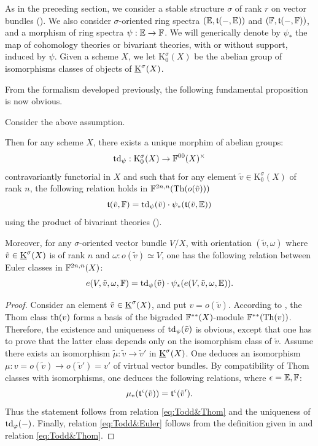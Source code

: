 \begin{num}\label{num:todd}
As in the preceding section, we consider a stable structure $\sigma$
 of rank $r$ on vector bundles
 ().
 We also consider $\sigma$-oriented ring spectra $(\mathbb E,\mathfrak{t}(-,\mathbb E))$ and $(\mathbb F,\mathfrak{t}(-,\mathbb F))$,
 and a morphism of ring spectra $\psi:\mathbb E \rightarrow \mathbb F$.
 We will generically denote by $\psi_*$ the map of cohomology theories or bivariant theories,
 with or without support, induced by $\psi$.
 Given a scheme $X$, we let $\mathrm{K}_0^\sigma(X)$ be the abelian group of isomorphisms classes of objects
 of $\operatorname{\underline K}^\sigma(X)$.

From the formalism developed previously,
 the following fundamental proposition is now obvious.
\end{num}
\begin{prop}\label{prop:computeToddclass}
Consider the above assumption.

Then for any scheme $X$, there exists a unique morphim of abelian groups:
$$
\operatorname{td}_\psi:\mathrm{K}_0^\sigma(X) \rightarrow \mathbb F^{00}(X)^\times
$$
contravariantly functorial in $X$ and such that for any element $\tilde v \in \mathrm{K}^\sigma_0(X)$
 of rank $n$,
 the following relation holds in $\mathbb F^{2n,n}(\operatorname{Th}(o(\tilde v)))$
\begin{equation}\label{eq:Todd&Thom}
\mathfrak{t}(\tilde v,\mathbb F)=\operatorname{td}_\psi(\tilde v)\cdot\psi_*(\mathfrak{t}(\tilde v,\mathbb E))
\end{equation}
using the product of bivariant theories ().

Moreover, for any $\sigma$-oriented vector bundle $V/X$,
 with orientation $(\tilde v,\omega)$ where $\tilde v \in \operatorname{\underline K}^\sigma(X)$ is of rank $n$ and $\omega:o(\tilde v)\simeq V$,
 one has the following relation between Euler classes in $\mathbb F^{2n,n}(X)$:
\begin{equation}\label{eq:Todd&Euler}
e(V,\tilde v,\omega,\mathbb F)=\operatorname{td}_\psi(\tilde v)\cdot\psi_*(e(V,\tilde v,\omega,\mathbb E)).
\end{equation}
\end{prop}
\begin{proof}
Consider an element $\tilde v \in \operatorname{\underline K}^\sigma(X)$, and put $v=o(\tilde v)$.
 According to , the Thom class $\operatorname{th}(v)$
 forms a basis of the bigraded $\mathbb F^{**}(X)$-module $\mathbb F^{**}(\operatorname{Th}(v))$.
 Therefore, the existence and uniqueness of $\operatorname{td}_\psi(\tilde v)$ is obvious,
 except that one has to prove that the latter class depends only on the isomorphism
 class of $\tilde v$.
 Assume there exists an isomorphism $\tilde \mu:\tilde v \rightarrow \tilde v'$ in $\operatorname{\underline K}^\sigma(X)$.
One deduces an isomorphism $\mu:v=o(\tilde v) \rightarrow o(\tilde v')=v'$ of virtual vector
 bundles. By compatibility of Thom classes with isomorphisms,
 one deduces the following relations, where $\epsilon=\mathbb E,\mathbb F$:
$$
\mu_*(\mathfrak{t}^\epsilon(\tilde v))=\mathfrak{t}^\epsilon(\tilde v').
$$
Thus the statement follows from relation \eqref{eq:Todd&Thom} and the uniqueness
 of $\operatorname{td}_\varphi(-)$.
 Finally, relation \eqref{eq:Todd&Euler} follows from the definition given in 
 and relation \eqref{eq:Todd&Thom}. 
\end{proof}

